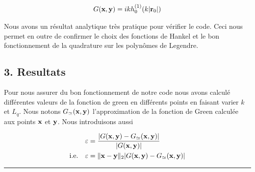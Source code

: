 \documentclass[10pt]{article}
\begin{document}
\begin{multicols}{2}
\begin{equation}
G({\bf x},{\bf y}) = ikh^{(1)}_{0}(k|{\bf r}_0|)
\end{equation}

Nous avons un résultat analytique très pratique pour vérifier le code. Ceci nous permet en outre de confirmer le choix des fonctions de Hankel et le bon fonctionnement de la quadrature sur les polynômes de Legendre. 



\vspace*{10pt}

\subsection*{3. Resultats}

Pour nous assurer du bon fonctionnement de notre code nous avons calculé différentes valeurs de la fonction de green en différents points en faisant varier $k$ et $L_q$. Nous notons $G_{\simeq}({\bf x}, {\bf y})$ l'approximation de la fonction de Green calculée aux points ${\bf x}$ et ${\bf y}$.  Nous introduisons aussi 


\begin{align}
 \varepsilon & = \frac{|G({\bf x}, {\bf y}) - G_{\simeq}({\bf x}, {\bf y})|}{|G({\bf x}, {\bf y})|} \\
 \text{i.e.} \quad \varepsilon & = \|{\bf x} -{\bf y}\|_{2}|G({\bf x}, {\bf y}) - G_{\simeq}({\bf x}, {\bf y})|
\end{align}


\end{multicols}

\rule{8cm}{1pt}
\end{document}
